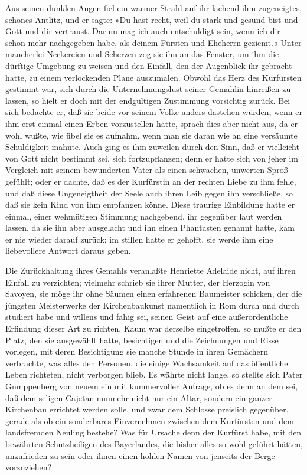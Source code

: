 Aus seinen dunklen Augen fiel ein warmer Strahl auf ihr lachend ihm
zugeneigtes, schönes Antlitz, und er sagte: »Du hast recht, weil du
stark und gesund bist und Gott und dir vertraust. Darum mag ich
auch entschuldigt sein, wenn ich dir schon mehr nachgegeben habe,
als deinem Fürsten und Eheherrn geziemt.« Unter mancherlei
Neckereien und Scherzen zog sie ihn an das Fenster, um ihm die
dürftige Umgebung zu weisen und den Einfall, den der Augenblick ihr
gebracht hatte, zu einem verlockenden Plane auszumalen. Obwohl das
Herz des Kurfürsten gestimmt war, sich durch die Unternehmungslust
seiner Gemahlin hinreißen zu lassen, so hielt er doch mit der
endgültigen Zustimmung vorsichtig zurück. Bei sich bedachte er, daß
sie beide vor seinem Volke anders dastehen würden, wenn er ihm erst
einmal einen \pagenum{[103]} Erben vorzustellen hätte, sprach dies
aber nicht aus, da er wohl wußte, wie übel sie es aufnahm, wenn man
sie daran wie an eine versäumte Schuldigkeit mahnte. Auch ging es
ihm zuweilen durch den Sinn, daß er vielleicht von Gott nicht
bestimmt sei, sich fortzupflanzen; denn er hatte sich von jeher im
Vergleich mit seinem bewunderten Vater als einen schwachen,
unwerten Sproß gefühlt; oder er dachte, daß es der Kurfürstin an
der rechten Liebe zu ihm fehle, und daß diese Ungeneigtheit der
Seele auch ihren Leib gegen ihn verschließe, so daß sie kein Kind
von ihm empfangen könne. Diese traurige Einbildung hatte er einmal,
einer wehmütigen Stimmung nachgebend, ihr gegenüber laut werden
lassen, da sie ihn aber ausgelacht und ihn einen Phantasten genannt
hatte, kam er nie wieder darauf zurück; im stillen hatte er
gehofft, sie werde ihm eine liebevollere Antwort daraus geben.

Die Zurückhaltung ihres Gemahls veranlaßte Henriette Adelaide
nicht, auf ihren Einfall zu verzichten; vielmehr schrieb sie ihrer
Mutter, der Herzogin von Savoyen, sie möge ihr ohne Säumen einen
erfahrenen Baumeister schicken, der die jüngsten Meisterwerke der
Kirchenbaukunst namentlich in Rom durch und durch studiert habe und
willens und fähig sei, seinen Geist auf eine außerordentliche
Erfindung dieser Art zu richten. Kaum war derselbe eingetroffen, so
mußte er den Platz, den sie ausgewählt hatte, besichtigen und die
Zeichnungen und Risse vorlegen, mit deren Besichtigung sie manche
Stunde in ihren Gemächern verbrachte, was alles den Personen, die
einige Wachsamkeit auf das öffentliche Leben richteten, nicht
verborgen blieb. Es währte nicht lange, so stellte sich Pater
Gumppenberg von neuem ein mit kummervoller Anfrage, ob es denn
\pagenum{[104]} an dem sei, daß dem seligen Cajetan nunmehr nicht
nur ein Altar, sondern ein ganzer Kirchenbau errichtet werden
solle, und zwar dem Schlosse preislich gegenüber, gerade als ob ein
sonderbares Einvernehmen zwischen dem Kurfürsten und dem
landsfremden Neuling bestehe? Was für Ursache denn der Kurfürst
habe, mit den bewährten Schutzheiligen des Bayerlandes, die bisher
alles so wohl geführt hätten, unzufrieden zu sein oder ihnen einen
hohlen Namen von jenseits der Berge vorzuziehen?

